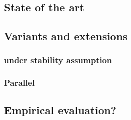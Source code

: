 \subsection{State of the art}
\label{sub:state_of_the_art}


\subsection{Variants and extensions}
\label{sub:variants_and_extensions}

\subsubsection{\pcc{} under stability assumption}
\label{ssub:cc_under_stability_assumption}

\iffalse
Haris Angelidakis, Konstantin Makarychev, and Yury Makarychev. 2017.
Algorithms for Stable and Perturbation-Resilient Problems. STOC’17
\href{http://ttic.uchicago.edu/~yury/papers/two-stable.pdf}{10.1145/3055399.3055487}
improves over the one cited in the internship description
\fi

\subsubsection{Parallel \pcc{}}
\label{ssub:parallel_cc}

\subsection{Empirical evaluation?}
\label{sub:cc_empiracal_evaluation}

